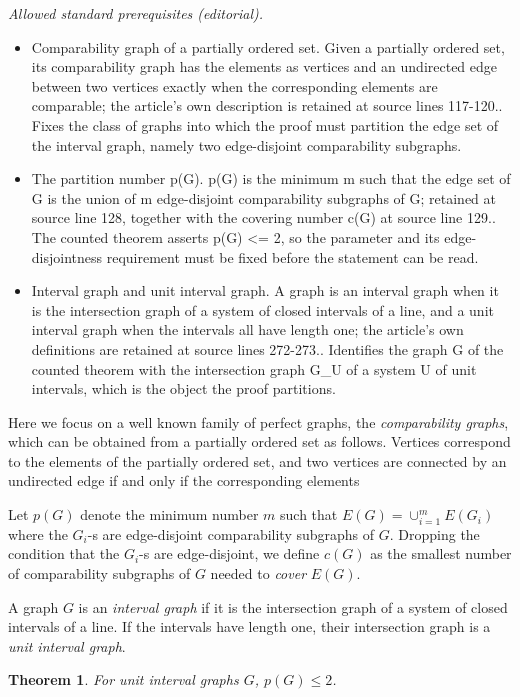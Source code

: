 \documentclass[12pt]{article}
\newtheorem{theorem}{Theorem}%
\begin{document}
\noindent\textit{Allowed standard prerequisites (editorial).}\begin{itemize}
\item Comparability graph of a partially ordered set. Given a partially ordered set, its comparability graph has the elements as vertices and an undirected edge between two vertices exactly when the corresponding elements are comparable; the article's own description is retained at source lines 117-120.. Fixes the class of graphs into which the proof must partition the edge set of the interval graph, namely two edge-disjoint comparability subgraphs.
\item The partition number p(G). p(G) is the minimum m such that the edge set of G is the union of m edge-disjoint comparability subgraphs of G; retained at source line 128, together with the covering number c(G) at source line 129.. The counted theorem asserts p(G) <= 2, so the parameter and its edge-disjointness requirement must be fixed before the statement can be read.
\item Interval graph and unit interval graph. A graph is an interval graph when it is the intersection graph of a system of closed intervals of a line, and a unit interval graph when the intervals all have length one; the article's own definitions are retained at source lines 272-273.. Identifies the graph G of the counted theorem with the intersection graph G\_U of a system U of unit intervals, which is the object the proof partitions.
\end{itemize}\medskip
Here we focus on a well known family of perfect graphs, the {\em comparability graphs},
which can be obtained from a partially ordered set as follows.
Vertices correspond to the elements of the partially ordered set,
and two vertices are connected by an undirected edge if and only if the corresponding elements

Let $p(G)$ denote the minimum number $m$ such that $E(G)=\cup_{i=1}^m E(G_i)$ where the $G_i$-s are edge-disjoint comparability subgraphs of $G$.
Dropping  the condition that the $G_i$-s are edge-disjoint, we define $c(G)$ as the smallest number of comparability subgraphs of $G$ needed to {\em cover} $E(G)$.

A graph $G$ is an {\em interval graph} if it is the intersection graph of a system of closed intervals of a line.
If the intervals have length one, their intersection graph is a {\em unit interval graph}.

\begin{theorem}\label{unit} For unit interval graphs $G$, $p(G)\le 2$.
\end{theorem}
\end{document}
